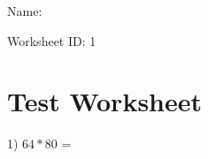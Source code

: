 \documentclass[12pt]{article}
\begin{document}

\begin{flushright}
Name: \underline{\hspace{2.5 in}}
\end{flushright}
\begin{flushright}
Worksheet ID: 1
\end{flushright}
\section*{Test Worksheet}

1) $64 * 80$ = \underline{\hspace{2 in}}
\end{document}
